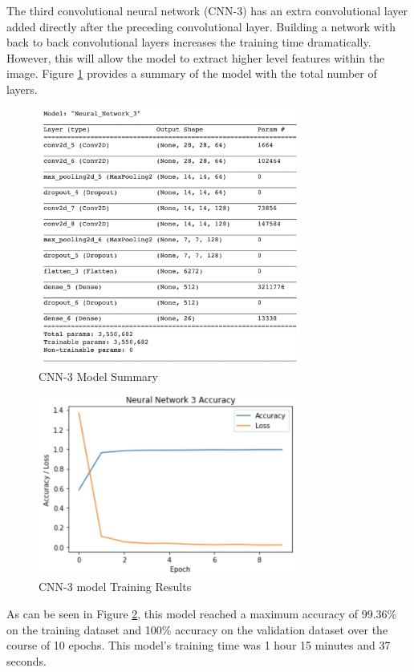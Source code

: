 \documentclass[5p,authoryear]{elsarticle}
\begin{document}
The third convolutional neural network (CNN-3) has an extra convolutional layer added directly after the preceding convolutional layer. Building a network with back to back convolutional layers increases the training time dramatically. However, this will allow the model to extract higher level features within the image. Figure \ref{CNN-3 Model Summary} provides a summary of the model with the total number of layers.


\begin{figure}[!h] 
    \centering
	\includegraphics[width=3.4in]{figures/CNN-3-Summary.png}
	\caption[]{CNN-3 Model Summary} 
	\label{CNN-3 Model Summary} 
\end{figure}


\begin{figure}[!htb] \centering
	\includegraphics[width=3.4in]{figures/CNN-3-training.png}
	\caption[]{CNN-3 model Training Results} 
	\label{CNN-3 model Training Results} 
\end{figure}


As can be seen in Figure \ref{CNN-3 model Training Results}, this model reached a maximum accuracy of 99.36\% on the training dataset and 100\% accuracy on the validation dataset over the course of 10 epochs. This model’s training time was 1 hour 15 minutes and 37 seconds.
\end{document}
